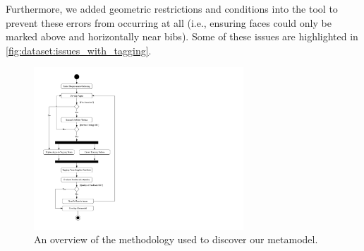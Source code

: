 \noindent
Furthermore, we added geometric restrictions and conditions into the tool to prevent these errors from occurring at all (i.e., ensuring faces could only be marked above and horizontally near bibs). Some of these issues are highlighted in \cref{fig:dataset:issues_with_tagging}.

\begin{figure}[p]
  \centering
  \includegraphics[width=0.7\textwidth]{images/dataset/methodology}
  \caption[Implementation methodology]{An overview of the methodology used to discover our metamodel.}
  \label{fig:dataset:methodology}
\end{figure}

